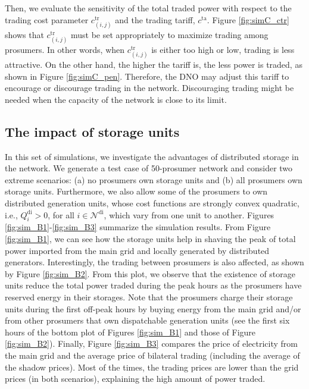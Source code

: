 \documentclass{IEEEtran}  %
\newcommand{\mc}{\mathcal}
\newcommand{\0}{\mathbf{0}}
\newcommand{\1}{\mathbf{1}}
\begin{document}
%
Then, we evaluate the sensitivity of the total traded power with respect to the trading cost parameter $c_{(i,j)}^{\mathrm{tr}}$ and the trading tariff, $c^{\mathrm{ta}}$. Figure \ref{fig:simC_ctr} shows that   $c_{(i,j)}^{\mathrm{tr}}$ must be set appropriately to maximize trading among prosumers. In other words, when $c_{(i,j)}^{\mathrm{tr}}$ is either too high or low, trading is less attractive. 
On the other hand, the higher the tariff is, the less power is traded, as shown in Figure \ref{fig:simC_pen}. Therefore, the DNO may adjust this tariff to encourage or discourage trading in the network. Discouraging trading might be needed when the capacity of the network is close to its limit. 



\subsection{The impact of storage units}
In this set of simulations, we investigate the advantages of distributed storage in the network. We generate a test case of 50-prosumer network and consider two extreme scenarios: (a) no prosumers own storage units and  (b) all prosumers own storage units. Furthermore, we also allow some of the prosumers to own distributed generation units, {whose cost functions are strongly convex quadratic, i.e., $Q_i^{\mathrm{di}}>0$, for all $i \in \mc N^{\mathrm{di}}$, which vary from one unit to another}. Figures \ref{fig:sim_B1}-\ref{fig:sim_B3} summarize the simulation results. From Figure \ref{fig:sim_B1}, we can see how the storage units help in shaving the peak of total power imported from the main grid and locally generated by distributed generators. Interestingly, the trading between prosumers is also affected, as shown by Figure \ref{fig:sim_B2}. From this plot, we observe that the existence of storage units reduce the total power traded during the peak hours as the prosumers have reserved energy in their storages. 
%
Note that the prosumers charge their storage units during the first off-peak hours by buying energy from the main grid and/or from other prosumers that own dispatchable generation units (see the first six hours of the bottom plot of Figures \ref{fig:sim_B1} and those of Figure \ref{fig:sim_B2}).  {Finally, Figure \ref{fig:sim_B3} compares the price of electricity from the main grid and the average price of bilateral trading (including the average of the shadow prices).  Most of the times, the trading prices are lower than the grid prices (in both scenarios), explaining the high amount of power traded.}%
\end{document}
